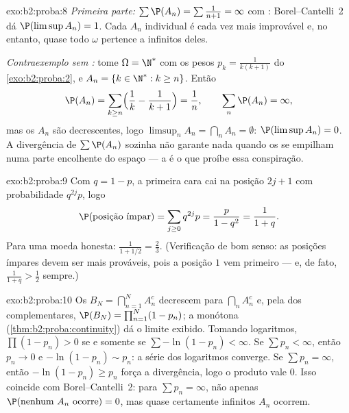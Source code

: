 \begin{solution}{exo:b2:proba:8}
\emph{Primeira parte:} $\sum \P(A_n) = \sum\frac{1}{n+1} = \infty$
com : Borel--Cantelli~2 dá $\P(\limsup A_n) = 1$.
Cada $A_n$ individual é cada vez mais improvável e, no entanto, quase todo
$\omega$ pertence a infinitos deles.

\emph{Contraexemplo sem :} tome $\Omega = \N^*$
com os pesos $p_k = \frac{1}{k(k+1)}$ do
\cref{exo:b2:proba:2}, e $A_n = \{k \in \N^* : k \geq n\}$.
Então
\[
\P(A_n) = \sum_{k \geq n}\Bigl(\frac1k - \frac1{k+1}\Bigr)
= \frac1n ,
\qquad
\sum_n \P(A_n) = \infty ,
\]
mas os $A_n$ são decrescentes, logo $\limsup_n A_n = \bigcap_n A_n =
\emptyset$: $\P(\limsup A_n) = 0$. A divergência de $\sum\P(A_n)$
sozinha não garante nada quando os  se empilham numa parte
encolhente do espaço --- a  é o que proíbe essa
conspiração.
\end{solution}

\begin{solution}{exo:b2:proba:9}
Com $q = 1 - p$, a primeira cara cai na posição $2j + 1$ com
probabilidade $q^{2j}p$, logo
\[
\P(\text{posição ímpar}) = \sum_{j\geq0}q^{2j}p
= \frac{p}{1 - q^2} = \frac{1}{1 + q} .
\]
Para uma moeda honesta: $\frac1{1 + 1/2} = \frac23$. (Verificação de bom senso:
as posições ímpares devem ser mais prováveis, pois a posição $1$ vem primeiro ---
e, de fato, $\frac1{1+q} > \frac12$ sempre.)
\end{solution}

\begin{solution}{exo:b2:proba:10}
Os  $B_N = \bigcap_{n=1}^N A_n^c$ decrescem para
$\bigcap_nA_n^c$ e, pela  dos complementares,
$\P(B_N) = \prod_{n=1}^N(1 - p_n)$; a  monótona
(\cref{thm:b2:proba:continuity}) dá o limite exibido.
Tomando logaritmos, $\prod(1 - p_n) > 0$ se e somente se $\sum-\ln(1 -
p_n) < \infty$. Se $\sum p_n < \infty$, então $p_n \to 0$ e
$-\ln(1 - p_n) \sim p_n$: a série dos logaritmos converge. Se
$\sum p_n = \infty$, então $-\ln(1 - p_n) \geq p_n$ força
a divergência, logo o produto vale $0$. Isso coincide com
Borel--Cantelli~2: para $\sum p_n = \infty$, não apenas
$\P(\text{nenhum }A_n\text{ ocorre}) = 0$, mas quase certamente
infinitos $A_n$ ocorrem.
\end{solution}

